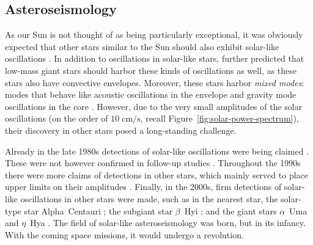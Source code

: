 \subsection{Asteroseismology}
As our Sun is not thought of as being particularly exceptional, it was obviously expected that other stars similar to the Sun should also exhibit solar-like oscillations \citep[e.g.,][]{1984srps.conf...11C}. 
In addition to oscillations in solar-like stars, \citet{1983SoPh...82..469C} further predicted that low-mass giant stars should harbor these kinds of oscillations as well, as these stars also have convective envelopes. %
Moreover, these stars harbor \emph{mixed modes}: modes that behave like acoustic oscillations in the envelope and gravity mode oscillations in the core \citep[e.g.,][]{2001MNRAS.328..601D}. 
However, due to the very small amplitudes of the solar oscillations (on the order of ${10\; \text{cm/s}}$, recall Figure~\ref{fig:solar-power-spectrum}), their discovery in other stars posed a long-standing challenge. 


Already in the late 1980s detections of solar-like oscillations were being claimed \citep{1986A&A...164..383G}. 
These were not however confirmed in follow-up studies \citep[e.g.,][]{1991MNRAS.249..643I}. 
Throughout the 1990s there were more claims of detections in other stars, which mainly served to place upper limits on their amplitudes \citep[e.g.,][]{1990ApJ...350..839B, 1991ApJ...368..599B, 1992A&A...264..138P, 1995MNRAS.276.1295E}. 
Finally, in the 2000s, firm detections of solar-like oscillations in other stars were made, such as in the nearest star, the solar-type star Alpha~Centauri \citep{2001A&A...374L...5B}; 
the subgiant star $\beta$~Hyi \citep{2001ApJ...549L.105B}; 
and the giant stars $\alpha$~Uma \citep{2000ApJ...532L.133B} and $\eta$~Hya \citep{2002A&A...394L...5F}. 
The field of solar-like asteroseismology was born, but in its infancy. 
With the coming space missions, it would undergo a revolution. 




